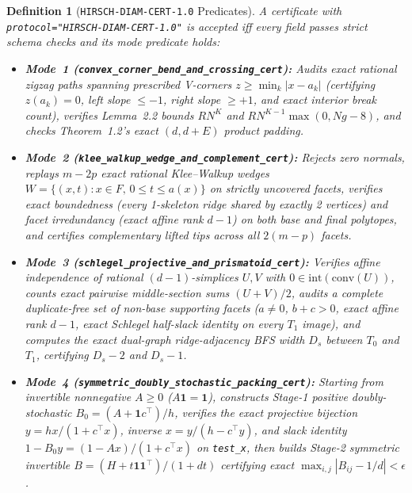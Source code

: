 \documentclass[10pt,twocolumn]{article}
\newtheorem{definition}{Definition}
\begin{document}
{\begin{definition}[\texttt{HIRSCH-DIAM-CERT-1.0} Predicates]\label{def:cert}
\normalfont A certificate with \texttt{protocol="HIRSCH-\allowbreak DIAM-\allowbreak CERT-1.0"} is accepted iff every field passes strict schema checks and its mode predicate holds:
\begin{itemize}[leftmargin=1.2em,itemsep=1pt,topsep=2pt]
  \item \textbf{Mode~1 (\texttt{convex\_\allowbreak corner\_\allowbreak bend\_\allowbreak and\_\allowbreak crossing\_\allowbreak cert}):} Audits exact rational zigzag paths spanning prescribed V-corners $z\ge\min_k|x-a_k|$ (certifying $z(a_k)=0$, left slope $\le -1$, right slope $\ge +1$, and exact interior break count), verifies Lemma~2.2 bounds $RN^K$ and $RN^{K-1}\max(0,Ng-8)$, and checks Theorem~1.2's exact $(d,d+E)$ product padding.
  \item \textbf{Mode~2 (\texttt{klee\_\allowbreak walkup\_\allowbreak wedge\_\allowbreak and\_\allowbreak complement\_\allowbreak cert}):} Rejects zero normals, replays $m-2p$ exact rational Klee--Walkup wedges $W=\{(x,t):x\in F,\,0\le t\le a(x)\}$ on strictly uncovered facets, verifies exact boundedness (every 1-skeleton ridge shared by exactly 2 vertices) and facet irredundancy (exact affine rank $d-1$) on both base and final polytopes, and certifies complementary lifted tips across all $2(m-p)$ facets.
  \item \textbf{Mode~3 (\texttt{schlegel\_\allowbreak projective\_\allowbreak and\_\allowbreak prismatoid\_\allowbreak cert}):} Verifies affine independence of rational $(d-1)$-simplices $U,V$ with $0\in\mathrm{int}(\mathrm{conv}(U))$, counts exact pairwise middle-section sums $(U+V)/2$, audits a complete duplicate-free set of non-base supporting facets ($a\ne 0$, $b+c>0$, exact affine rank $d-1$, exact Schlegel half-slack identity on every $T_1$ image), and computes the exact dual-graph ridge-adjacency BFS width $D_s$ between $T_0$ and $T_1$, certifying $D_s-2$ and $D_s-1$.
  \item \textbf{Mode~4 (\texttt{symmetric\_\allowbreak doubly\_\allowbreak stochastic\_\allowbreak packing\_\allowbreak cert}):} Starting from invertible nonnegative $A\ge 0$ ($A\mathbf{1}=\mathbf{1}$), constructs Stage-1 positive doubly-stochastic $B_0=(A+\mathbf{1}c^\top)/h$, verifies the exact projective bijection $y=hx/(1+c^\top x)$, inverse $x=y/(h-c^\top y)$, and slack identity $1-B_0y=(1-Ax)/(1+c^\top x)$ on \texttt{test\_x}, then builds Stage-2 symmetric invertible $B=(H+t\mathbf{1}\mathbf{1}^\top)/(1+dt)$ certifying exact $\max_{i,j}|B_{ij}-1/d|<\epsilon$.
\end{itemize}
\end{definition}}
\end{document}
